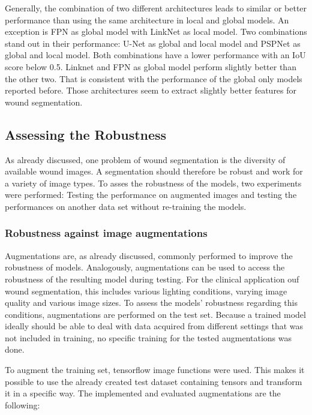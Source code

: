Generally, the combination of two different architectures leads to similar or better performance than using the same architecture in local and global models. An exception is FPN as global model with LinkNet as local model. Two combinations stand out in their performance: U-Net as global and local model and PSPNet as global and local model. Both combinations have a lower performance with an IoU score below 0.5. Linknet and FPN as global model perform slightly better than the other two. That is consistent with the performance of the global only models reported before. Those architectures seem to extract slightly better features for wound segmentation.

\subsection{Assessing the Robustness}

As already discussed, one problem of wound segmentation is the diversity of available wound images. A segmentation should therefore be robust and work for a variety of image types. To asses the robustness of the models, two experiments were performed: Testing the performance on augmented images and testing the performances on another data set without re-training the models.

\subsubsection{Robustness against image augmentations}

Augmentations are, as already discussed, commonly performed to improve the robustness of models. Analogously, augmentations can be used to access the robustness of the resulting model during testing. For the clinical application ouf wound segmentation, this includes various lighting conditions, varying image quality and various image sizes. To assess the models' robustness regarding this conditions, augmentations are performed on the test set. Because a trained model ideally should be able to deal with data acquired from different settings that was not included in training, no specific training for the tested augmentations was done.

To augment the training set, tensorflow image functions were used. This makes it possible to use the already created test dataset containing tensors and transform it in a specific way. The implemented and evaluated augmentations are the following:

